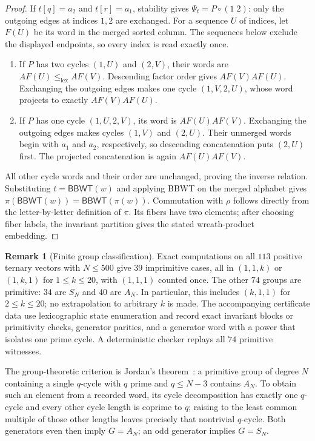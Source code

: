 \documentclass[11pt,a4paper]{article}
\theoremstyle{definition}
\newtheorem{remark}{Remark}
\newcommand{\BBWT}{\mathsf{BBWT}}
\newcommand{\lex}{\mathrm{lex}}
\begin{document}
\begin{proof}
If $t[q]=a_2$ and $t[r]=a_1$, stability gives $\Psi_t=P\circ(1\;2)$: only the outgoing edges at indices $1,2$ are exchanged. For a sequence $U$ of indices, let $F(U)$ be its word in the merged sorted column. The sequences below exclude the displayed endpoints, so every index is read exactly once.
\begin{enumerate}[label=(\arabic*),leftmargin=*]
    \item If $P$ has two cycles $(1,U)$ and $(2,V)$, their words are $AF(U)\le_{\lex}AF(V)$. Descending factor order gives $AF(V)AF(U)$. Exchanging the outgoing edges makes one cycle $(1,V,2,U)$, whose word projects to exactly $AF(V)AF(U)$.
    \item If $P$ has one cycle $(1,U,2,V)$, its word is $AF(U)AF(V)$. Exchanging the outgoing edges makes cycles $(1,V)$ and $(2,U)$. Their unmerged words begin with $a_1$ and $a_2$, respectively, so descending concatenation puts $(2,U)$ first. The projected concatenation is again $AF(U)AF(V)$.
\end{enumerate}
All other cycle words and their order are unchanged, proving the inverse relation. Substituting $t=\BBWT(w)$ and applying BBWT on the merged alphabet gives $\pi(\BBWT(w))=\BBWT(\pi(w))$. Commutation with $\rho$ follows directly from the letter-by-letter definition of $\pi$. Its fibers have two elements; after choosing fiber labels, the invariant partition gives the stated wreath-product embedding.
\end{proof}

\begin{remark}[Finite group classification]
Exact computations on all $113$ positive ternary vectors with $N\le500$ give $39$ imprimitive cases, all in $(1,1,k)$ or $(1,k,1)$ for $1\le k\le20$, with $(1,1,1)$ counted once. The other $74$ groups are primitive: $34$ are $S_N$ and $40$ are $A_N$. In particular, this includes $(k,1,1)$ for $2\le k\le20$; no extrapolation to arbitrary $k$ is made. The accompanying certificate data use lexicographic state enumeration and record exact invariant blocks or primitivity checks, generator parities, and a generator word with a power that isolates one prime cycle. A deterministic checker replays all $74$ primitive witnesses.

The group-theoretic criterion is Jordan's theorem~\cite{DixonMortimer1996}: a primitive group of degree $N$ containing a single $q$-cycle with $q$ prime and $q\le N-3$ contains $A_N$. To obtain such an element from a recorded word, its cycle decomposition has exactly one $q$-cycle and every other cycle length is coprime to $q$; raising to the least common multiple of those other lengths leaves precisely that nontrivial $q$-cycle. Both generators even then imply $G=A_N$; an odd generator implies $G=S_N$.
\end{remark}
\end{document}
